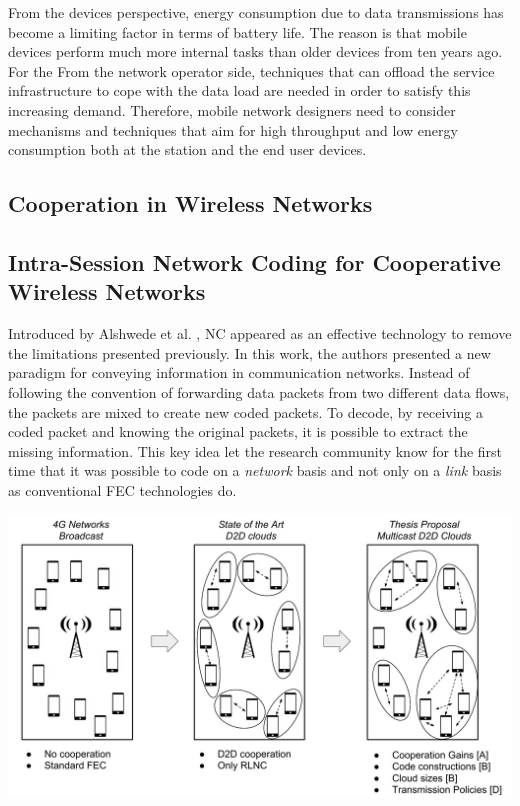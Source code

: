 From the devices perspective, energy consumption due to data transmissions has become a limiting factor in terms of battery life. The reason is that mobile devices perform much more internal tasks than older devices from ten years ago. For the From the network operator side, techniques that can offload the service infrastructure to cope with the data load are needed in order to satisfy this increasing demand. Therefore, mobile network designers need to consider mechanisms and techniques that aim for high throughput and low energy consumption both at the station and the end user devices.

\subsection{Cooperation in Wireless Networks}



\subsection{Intra-Session Network Coding for Cooperative Wireless Networks}
Introduced by Alshwede et al. \cite{ahlswede2000network}, \ac{NC} appeared as an effective technology to remove the limitations presented previously. In this work, the authors presented a new paradigm for conveying information in communication networks. Instead of following the convention of forwarding data packets from two different data flows, the packets are mixed to create new coded packets. To decode, by receiving a coded packet and knowing the original packets, it is possible to extract the missing information. This key idea let the research community know for the first time that it was possible to code on a \textit{network} basis and not only on a \textit{link} basis as conventional \ac{FEC} technologies do.


\includegraphics[width=\textwidth]{introduction/figures/thesis-diagrams.pdf}